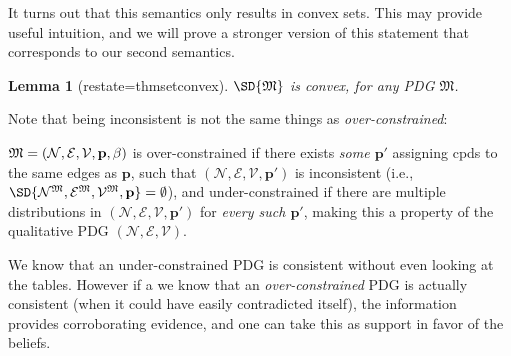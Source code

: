 \documentclass{article}
\theoremstyle{plain}
\newtheorem{lemma}[theorem]{Lemma}
\theoremstyle{definition}
\theoremstyle{remark}
\newcommand\mat[1]{\mathbf{#1}}
\newcommand{\notation}[2][]{#1}
\renewcommand{\notation}[2][]{{\color{notationcolor} #2}}
\newcommand{\V}{\mathcal V}
\newcommand{\N}{\mathcal N}
\newcommand{\Ed}{\mathcal E}
\newcommand{\dg}[1]{\mathfrak{#1}}
\newcommand{\MN}{PDG}
\numberwithin{equation}{section}
\begin{document}
	\begin{vfull}
		It turns out that this semantics only results in convex sets. This may provide useful intuition, and we will prove a stronger version of this statement that corresponds to our second semantics.
		\begin{lemma}[restate=thmsetconvex] 
			\label{prop:convex}
			$\SD{\dg M}$ is convex, for any PDG $\dg M$.
		\end{lemma}
	
		Note that being inconsistent is not the same things as \emph{over-constrained}: 	
		\begin{defn}

			$\dg M = \mnvars[]$ is over-constrained if there exists
			  \emph{some $\mat p'$} assigning cpds to the same edges as
			  $\mat p$, such that $(\N, \Ed, \V, \mat p')$ is inconsistent
			  \notation{(i.e., $\SD{\N^\dg M, \Ed^\dg M, \V^\dg M, \mat p}
				= \emptyset$)}, and under-constrained if there are
			  multiple distributions in $(\N, \Ed, \V, \mat p')$ for
			  \emph{every such $\mat p'$}, making this a property of the
			  qualitative PDG $(\N, \Ed, \V)$.  
		\end{defn}

		We know that an under-constrained PDG is consistent without even looking at the tables. However if a we know that an \emph{over-constrained} PDG is actually consistent (when it could have easily contradicted itself), the information provides corroborating evidence, and one can take this as support in favor of the beliefs. 
	\end{vfull}
        
\end{document}
